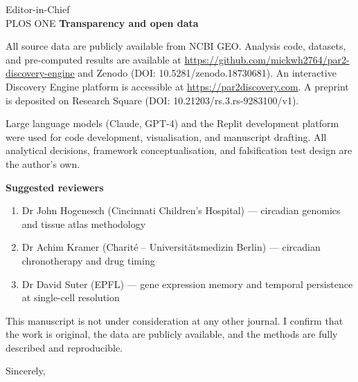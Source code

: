 \documentclass[11pt]{letter}
\begin{document}
\begin{letter}{Editor-in-Chief \\ PLOS ONE}
\textbf{Transparency and open data}

All source data are publicly available from NCBI GEO. Analysis code, datasets, and pre-computed results are available at \url{https://github.com/mickwh2764/par2-discovery-engine} and Zenodo (DOI: 10.5281/zenodo.18730681). An interactive Discovery Engine platform is accessible at \url{https://par2discovery.com}. A preprint is deposited on Research Square (DOI: 10.21203/rs.3.rs-9283100/v1).

Large language models (Claude, GPT-4) and the Replit development platform were used for code development, visualisation, and manuscript drafting. All analytical decisions, framework conceptualisation, and falsification test design are the author's own.

\textbf{Suggested reviewers}

\begin{enumerate}
    \item Dr John Hogenesch (Cincinnati Children's Hospital) --- circadian genomics and tissue atlas methodology
    \item Dr Achim Kramer (Charit\'{e} -- Universit\"{a}tsmedizin Berlin) --- circadian chronotherapy and drug timing
    \item Dr David Suter (EPFL) --- gene expression memory and temporal persistence at single-cell resolution
\end{enumerate}

This manuscript is not under consideration at any other journal. I confirm that the work is original, the data are publicly available, and the methods are fully described and reproducible.

\closing{Sincerely,}

\end{letter}
\end{document}
